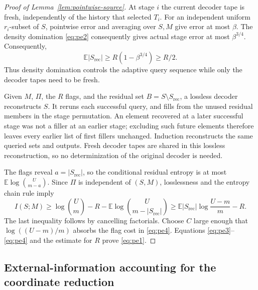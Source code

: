 \documentclass[11pt,letterpaper]{article}
\numberwithin{equation}{section}
\newcommand{\E}{\mathbb E}
\begin{document}
\begin{proof}[Proof of Lemma~\ref{lem:pointwise-source}]
At stage $i$ the current decoder tape is fresh, independently of the history that selected $T_i$.
For an independent uniform $r_i$-subset of $S$, pointwise error and averaging over $S,M$ give error at most $\beta$.
The density domination \eqref{eq:pe2} consequently gives actual stage error at most $\beta^{3/4}$.
Consequently,
\begin{equation}
\E|S_{\mathrm{rec}}|\ge R(1-\beta^{3/4})\ge R/2.
 \label{eq:pe3}
\end{equation}
Thus density domination controls the adaptive query sequence while only the decoder tapes need to be fresh.

Given $M$, $\Pi$, the $R$ flags, and the residual set $B=S\setminus S_{\mathrm{rec}}$, a lossless decoder reconstructs $S$.
It reruns each successful query, and fills from the unused residual members in the stage permutation.
An element recovered at a later successful stage was not a filler at an earlier stage; excluding such future elements therefore leaves every earlier list of first fillers unchanged.
Induction reconstructs the same queried sets and outputs.
Fresh decoder tapes are shared in this lossless reconstruction, so no determinization of the original decoder is needed.

The flags reveal $a=|S_{\mathrm{rec}}|$, so the conditional residual entropy is at most $\E\log\binom{U}{m-a}$.
Since $\Pi$ is independent of $(S,M)$, losslessness and the entropy chain rule imply
\begin{equation}
I(S;M)\ge\log\binom{U}{m}-R-
                   \E\log\binom{U}{m-|S_{\mathrm{rec}}|}
 \ge\E|S_{\mathrm{rec}}|\log\frac{U-m}{m}-R.
 \label{eq:pe4}
\end{equation}
The last inequality follows by cancelling factorials.
Choose $C$ large enough that $\log((U-m)/m)$ absorbs the flag cost in \eqref{eq:pe4}.
Equations \eqref{eq:pe3}--\eqref{eq:pe4} and the estimate for $R$ prove \eqref{eq:pe1}.
\end{proof}



\subsection{External-information accounting for the coordinate reduction}
\label{app:coordinate-reduction-proof}
\end{document}
